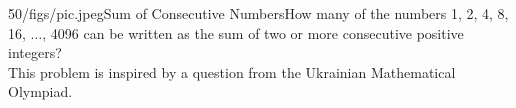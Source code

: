 \begin{problem}{50/figs/pic.jpeg}{Sum of Consecutive Numbers}How many of the numbers 1, 2, 4, 8, 16, $\ldots$, 4096 can be written as the sum of two or more consecutive positive integers?\\[0.2cm]
	
	This problem is inspired by a question from the Ukrainian Mathematical Olympiad.
\end{problem}